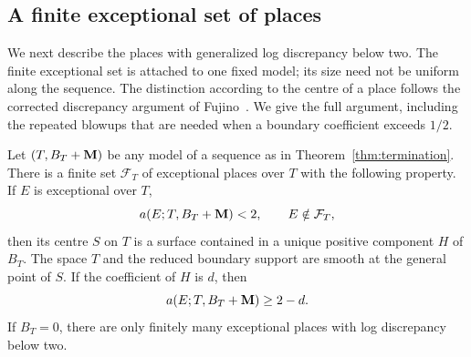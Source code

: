 \subsection{A finite exceptional set of places}

We next describe the places with generalized log discrepancy below two.
The finite exceptional set is attached to one fixed model; its size need
not be uniform along the sequence.  The distinction according to the
centre of a place follows the corrected discrepancy argument of
Fujino~\cite[Proposition~3.1 and Lemma~3.2]{Fujino2005Addendum}.  We give
the full argument, including the repeated blowups that are needed when a
boundary coefficient exceeds $1/2$.

\begin{lemma}
\label{lem:low-places}
Let $(T,B_T+\mathbf M)$ be any model of a sequence as in Theorem~\ref{thm:termination}.  There is a
finite set $\mathcal F_T$ of exceptional places over $T$ with the following
property.  If $E$ is exceptional over $T$,
\[
 a(E;T,B_T+\mathbf M)<2,
 \qquad E\notin\mathcal F_T,
\]
then its centre $S$ on $T$ is a surface contained in a unique positive
component $H$ of $B_T$.  The space $T$ and the reduced boundary support are
smooth at the general point of $S$.  If the coefficient of $H$ is $d$,
then
\begin{equation}
 a(E;T,B_T+\mathbf M)\geq2-d.
 \label{eq:low-place-threshold}
\end{equation}
If $B_T=0$, there are only finitely many exceptional places with log
discrepancy below two.
\end{lemma}

